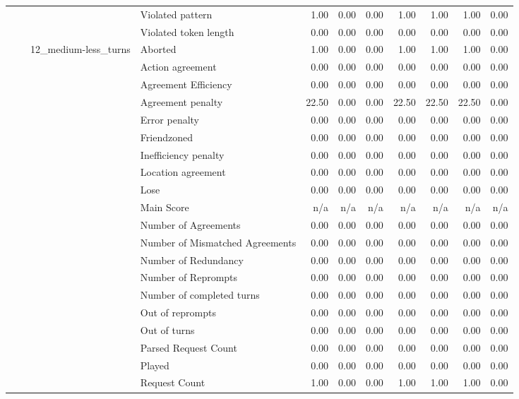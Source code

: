 \begin{tabular}{llllrrrrrrr}
 &  &  & Violated pattern & 1.00 & 0.00 & 0.00 & 1.00 & 1.00 & 1.00 & 0.00 \\
 &  &  & Violated token length & 0.00 & 0.00 & 0.00 & 0.00 & 0.00 & 0.00 & 0.00 \\
\cline{3-11}
 &  & \multirow[t]{27}{*}{12_medium-less_turns} & Aborted & 1.00 & 0.00 & 0.00 & 1.00 & 1.00 & 1.00 & 0.00 \\
 &  &  & Action agreement & 0.00 & 0.00 & 0.00 & 0.00 & 0.00 & 0.00 & 0.00 \\
 &  &  & Agreement Efficiency & 0.00 & 0.00 & 0.00 & 0.00 & 0.00 & 0.00 & 0.00 \\
 &  &  & Agreement penalty & 22.50 & 0.00 & 0.00 & 22.50 & 22.50 & 22.50 & 0.00 \\
 &  &  & Error penalty & 0.00 & 0.00 & 0.00 & 0.00 & 0.00 & 0.00 & 0.00 \\
 &  &  & Friendzoned & 0.00 & 0.00 & 0.00 & 0.00 & 0.00 & 0.00 & 0.00 \\
 &  &  & Inefficiency penalty & 0.00 & 0.00 & 0.00 & 0.00 & 0.00 & 0.00 & 0.00 \\
 &  &  & Location agreement & 0.00 & 0.00 & 0.00 & 0.00 & 0.00 & 0.00 & 0.00 \\
 &  &  & Lose & 0.00 & 0.00 & 0.00 & 0.00 & 0.00 & 0.00 & 0.00 \\
 &  &  & Main Score & n/a & n/a & n/a & n/a & n/a & n/a & n/a \\
 &  &  & Number of Agreements & 0.00 & 0.00 & 0.00 & 0.00 & 0.00 & 0.00 & 0.00 \\
 &  &  & Number of Mismatched Agreements & 0.00 & 0.00 & 0.00 & 0.00 & 0.00 & 0.00 & 0.00 \\
 &  &  & Number of Redundancy & 0.00 & 0.00 & 0.00 & 0.00 & 0.00 & 0.00 & 0.00 \\
 &  &  & Number of Reprompts & 0.00 & 0.00 & 0.00 & 0.00 & 0.00 & 0.00 & 0.00 \\
 &  &  & Number of completed turns & 0.00 & 0.00 & 0.00 & 0.00 & 0.00 & 0.00 & 0.00 \\
 &  &  & Out of reprompts & 0.00 & 0.00 & 0.00 & 0.00 & 0.00 & 0.00 & 0.00 \\
 &  &  & Out of turns & 0.00 & 0.00 & 0.00 & 0.00 & 0.00 & 0.00 & 0.00 \\
 &  &  & Parsed Request Count & 0.00 & 0.00 & 0.00 & 0.00 & 0.00 & 0.00 & 0.00 \\
 &  &  & Played & 0.00 & 0.00 & 0.00 & 0.00 & 0.00 & 0.00 & 0.00 \\
 &  &  & Request Count & 1.00 & 0.00 & 0.00 & 1.00 & 1.00 & 1.00 & 0.00 \\

\end{tabular}
